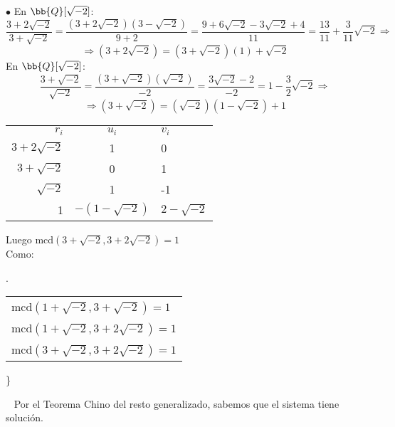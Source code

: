 \documentclass[12pt]{article}
\newcounter{ejercicio}[section] %
\newcounter{ejercicio}
\begin{document}
\begin{ejercicio}[2.5 puntos]
        \noindent
        $\bullet$ En $\bb{Q}[\sqrt{-2}]$:
        $$\dfrac{3+2\sqrt{-2}}{3+\sqrt{-2}} = \dfrac{(3+2\sqrt{-2})(3-\sqrt{-2})}{9+2} = \dfrac{9+6\sqrt{-2}-3\sqrt{-2}+4}{11} = \dfrac{13}{11}+\dfrac{3}{11}\sqrt{-2} \Rightarrow$$
        $$\Rightarrow (3+2\sqrt{-2})=(3+\sqrt{-2})(1)+\sqrt{-2}$$
        En $\bb{Q}[\sqrt{-2}]$:
        $$\dfrac{3+\sqrt{-2}}{\sqrt{-2}} = \dfrac{(3+\sqrt{-2})(\sqrt{-2})}{-2} = \dfrac{3\sqrt{-2}-2}{-2} = 1-\dfrac{3}{2}\sqrt{-2} \Rightarrow$$
        $$\Rightarrow (3+\sqrt{-2})=(\sqrt{-2})(1-\sqrt{-2})+1$$
        \begin{center}
        \begin{tabular}{rcl}
            $r_i$ & $u_i$ & $v_i$ \\
            $3+2\sqrt{-2}$ & 1 & 0 \\
            $3+\sqrt{-2}$ & 0 & 1 \\
            $\sqrt{-2}$ & 1 & -1 \\
            1 & $-(1-\sqrt{-2})$ & $2-\sqrt{-2}$
        \end{tabular}
        \end{center}
        Luego mcd$(3+\sqrt{-2}, 3+2\sqrt{-2}) = 1$\\

        \noindent
        Como:
        \begin{center}
            \left.\begin{tabular}{l}
            mcd$(1+\sqrt{-2}, 3+\sqrt{-2}) = 1$ \\
            mcd$(1+\sqrt{-2}, 3+2\sqrt{-2}) = 1$\\
            mcd$(3+\sqrt{-2}, 3+2\sqrt{-2}) = 1$
        \end{tabular}\right\}
        \end{center}

        \ \newline
        \noindent
        Por el Teorema Chino del resto generalizado, sabemos que el sistema tiene solución.\\
        

\end{ejercicio}
\end{document}
